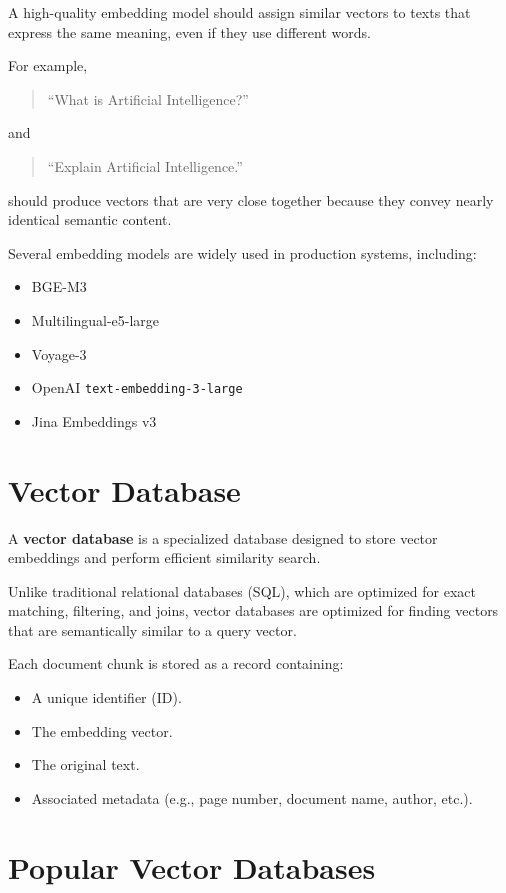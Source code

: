 A high-quality embedding model should assign similar vectors to texts that express the same meaning, even if they use different words.

For example,

\begin{quote}
``What is Artificial Intelligence?''
\end{quote}

and

\begin{quote}
``Explain Artificial Intelligence.''
\end{quote}

should produce vectors that are very close together because they convey nearly identical semantic content.

Several embedding models are widely used in production systems, including:

\begin{itemize}
    \item BGE-M3
    \item Multilingual-e5-large
    \item Voyage-3
    \item OpenAI \texttt{text-embedding-3-large}
    \item Jina Embeddings v3
\end{itemize}


\section{Vector Database}

A \textbf{vector database} is a specialized database designed to store vector embeddings and perform efficient similarity search.

Unlike traditional relational databases (SQL), which are optimized for exact matching, filtering, and joins, vector databases are optimized for finding vectors that are semantically similar to a query vector.

Each document chunk is stored as a record containing:

\begin{itemize}
    \item A unique identifier (ID).
    \item The embedding vector.
    \item The original text.
    \item Associated metadata (e.g., page number, document name, author, etc.).
\end{itemize}
\section{Popular Vector Databases}

